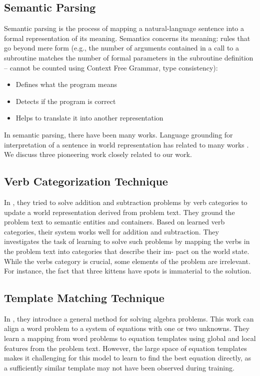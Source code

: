 \documentclass[document.tex]{subfiles}
\begin{document}
\subsection{Semantic Parsing}
\noindent Semantic parsing is the process of mapping a natural-language sentence into a formal representation of its meaning. Semantics concerns its meaning: rules that go beyond mere
form (e.g., the number of arguments contained in a call to a
subroutine matches the number of formal parameters in the
subroutine definition – cannot be counted using Context Free Grammar, type
consistency):
\begin{itemize}
	\item Defines what the program means
	\item Detects if the program is correct
	\item Helps to translate it into another representation
\end{itemize}
In semantic parsing, there have been many works. Language grounding for interpretation of a sentence in world representation has related to many works \cite{13, 14, 15, 16, 17, 18, 19, 20, 21, 22, 23}. We discuss three pioneering work closely related to our work.
\subsection{Verb Categorization Technique}
\noindent In \cite{1}, they tried to solve addition and subtraction problems by verb categories to update a world representation derived from problem text. They ground the problem text to semantic entities and containers. Based on learned verb categories, their system works well for addition and subtraction.
They investigates the task of learning to
solve such problems by mapping the verbs in the
problem text into categories that describe their im-
pact on the world state. While the verbs category
is crucial, some elements of the
problem are irrelevant. For instance, the fact that
three kittens have spots is immaterial to the solution. 
\subsection{Template Matching Technique}
\noindent In \cite{2}, they introduce a general method for solving algebra problems. This work can align a word problem to a system of equations with one or two unknowns. They learn a mapping from word problems to equation templates using global and local features from the problem text. However, the
large space of equation templates makes it challenging for this model to learn to find the best equation
directly, as a sufficiently similar template may not
have been observed during training.
\end{document}
